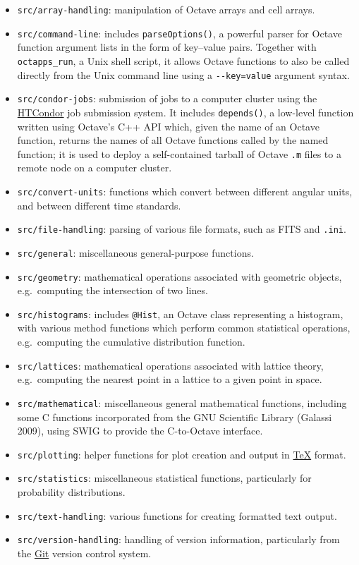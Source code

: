 \documentclass[10pt,a4paper,onecolumn]{article}
\providecommand{\tightlist}{%
  \setlength{\itemsep}{0pt}\setlength{\parskip}{0pt}}
\begin{document}
\begin{itemize}
\tightlist
\item
  \texttt{src/array-handling}: manipulation of Octave arrays and cell
  arrays.
\item
  \texttt{src/command-line}: includes \texttt{parseOptions()}, a
  powerful parser for Octave function argument lists in the form of
  key--value pairs. Together with \texttt{octapps\_run}, a Unix shell
  script, it allows Octave functions to also be called directly from the
  Unix command line using a \texttt{-\/-key=value} argument syntax.
\item
  \texttt{src/condor-jobs}: submission of jobs to a computer cluster
  using the \href{https://research.cs.wisc.edu/htcondor}{HTCondor} job
  submission system. It includes \texttt{depends()}, a low-level
  function written using Octave's C++ API which, given the name of an
  Octave function, returns the names of all Octave functions called by
  the named function; it is used to deploy a self-contained tarball of
  Octave \texttt{.m} files to a remote node on a computer cluster.
\item
  \texttt{src/convert-units}: functions which convert between different
  angular units, and between different time standards.
\item
  \texttt{src/file-handling}: parsing of various file formats, such as
  FITS and \texttt{.ini}.
\item
  \texttt{src/general}: miscellaneous general-purpose functions.
\item
  \texttt{src/geometry}: mathematical operations associated with
  geometric objects, e.g.~computing the intersection of two lines.
\item
  \texttt{src/histograms}: includes \texttt{@Hist}, an Octave class
  representing a histogram, with various method functions which perform
  common statistical operations, e.g.~computing the cumulative
  distribution function.
\item
  \texttt{src/lattices}: mathematical operations associated with lattice
  theory, e.g.~computing the nearest point in a lattice to a given point
  in space.
\item
  \texttt{src/mathematical}: miscellaneous general mathematical
  functions, including some C functions incorporated from the GNU
  Scientific Library (Galassi 2009), using SWIG to provide the
  C-to-Octave interface.
\item
  \texttt{src/plotting}: helper functions for plot creation and output
  in \href{https://www.tug.org}{TeX} format.
\item
  \texttt{src/statistics}: miscellaneous statistical functions,
  particularly for probability distributions.
\item
  \texttt{src/text-handling}: various functions for creating formatted
  text output.
\item
  \texttt{src/version-handling}: handling of version information,
  particularly from the \href{https://git-scm.com}{Git} version control
  system.
\end{itemize}
\end{document}
